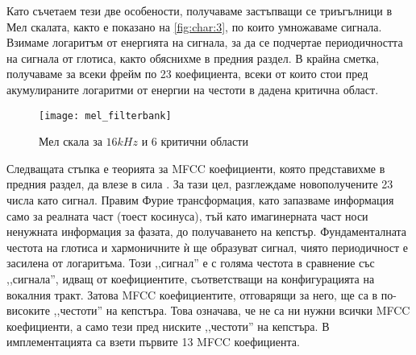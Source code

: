 \documentclass[main.tex]{subfiles}
\begin{document}
    Като съчетаем тези две особености, получаваме застъпващи се триъгълници в Мел скалата, както е показано на \autoref{fig:char:3}, по които умножаваме сигнала. Взимаме логаритъм от енергията на сигнала, за да се подчертае периодичността на сигнала от глотиса, както обяснихме в предния раздел.
    В крайна сметка, получаваме за всеки фрейм по 23 коефициента, всеки от които стои пред акумулираните логаритми от енергии на честоти в дадена критична област.

    \begin{figure}[H]
        \centering
        \texttt{[image: mel\_filterbank]}%
        \caption{Мел скала за $16kHz$ и 6 критични области}
        \label{fig:char:3}
    \end{figure}

    Следващата стъпка е теорията за MFCC коефициенти, която представихме в предния раздел, да влезе в сила . За тази цел, разглеждаме новополучените 23 числа като сигнал.  Правим Фурие трансформация, като запазваме информация само за реалната част (тоест косинуса), тъй като имагинерната част носи ненужната информация за фазата, до получаването на кепстър. Фундаменталната честота на глотиса и хармоничните ѝ ще образуват сигнал, чиято периодичност е засилена от логаритъма. Този ,,сигнал'' е с голяма честота в сравнение със ,,сигнала'', идващ от коефициентите, съответстващи на конфигурацията на вокалния тракт. Затова MFCC коефициентите, отговарящи за него, ще са в по-високите ,,честоти'' на кепстъра.
    Това означава, че не са ни нужни всички MFCC коефициенти, а само тези пред ниските ,,честоти'' на кепстъра. В имплементацията са взети първите 13 MFCC коефициента.
\end{document}
